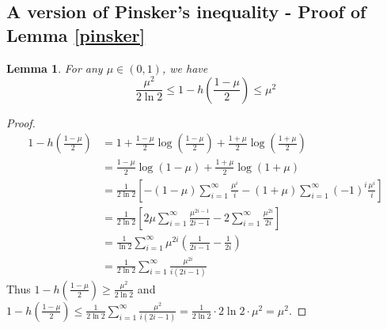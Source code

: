 \documentclass[12pt]{article}
\newtheorem*{lemma*}{Lemma}
\begin{document}
\subsection{A version of Pinsker's inequality - Proof of Lemma \ref{pinsker}}\label{apinsker}
\begin{lemma*}\label{pconverse}
For any $\mu\in(0,1)$, we have $$\frac{\mu^2}{2\ln2}\leq1-h\left(\frac{1-\mu}{2}\right)\leq \mu^2$$
\end{lemma*}
\begin{proof}
\begin{align*}
    1-h(\frac{1-\mu}{2})&=1+\frac{1-\mu}{2}\log\left( \frac{1-\mu}{2} \right)+\frac{1+\mu}{2}\log\left( \frac{1+\mu}{2} \right)\\
    &=\frac{1-\mu}{2}\log\left( 1-\mu\right)+\frac{1+\mu}{2}\log\left( 1+\mu\right)\\
    &=\frac{1}{2\ln2}\left[ -(1-\mu)\sum_{i=1}^\infty\frac{\mu^i}{i}-(1+\mu)\sum_{i=1}^\infty(-1)^i\frac{\mu^i}{i}  \right]\\
    &=\frac{1}{2\ln2}\left[ 2\mu\sum_{i=1}^\infty\frac{\mu^{2i-1}}{2i-1}-2\sum_{i=1}^\infty\frac{\mu^{2i}}{2i}  \right]\\
    &=\frac{1}{\ln2}\sum_{i=1}^\infty\mu^{2i}\left( \frac{1}{2i-1}-\frac{1}{2i}  \right)\\
    &=\frac{1}{2\ln2}\sum_{i=1}^\infty \frac{\mu^{2i}}{i(2i-1)}
\end{align*}
Thus $1-h(\frac{1-\mu}{2})\geq\frac{\mu^2}{2\ln2}$ and $1-h(\frac{1-\mu}{2})\leq \frac{1}{2\ln2} \sum_{i=1}^\infty \frac{\mu^2}{i(2i-1)}=\frac{1}{2\ln2}\cdot2\ln2\cdot \mu^2=\mu^2$.
\end{proof}
\newpage


\end{document}
